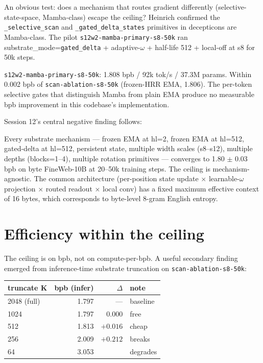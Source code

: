 An obvious test: does a mechanism that routes gradient differently (selective-state-space, Mamba-class) escape the ceiling? Heinrich confirmed the \texttt{\_selective\_scan} and \texttt{\_gated\_delta\_states} primitives in decepticons are Mamba-class. The pilot \texttt{s12w2-mamba-primary-s8-50k} ran substrate\_mode=\texttt{gated\_delta} + adaptive-$\omega$ + half-life 512 + local-off at s8 for 50k steps.

\begin{result}
\texttt{s12w2-mamba-primary-s8-50k}: 1.808 bpb / 92k tok/s / 37.3M params. Within 0.002 bpb of \texttt{scan-ablation-s8-50k} (frozen-HRR EMA, 1.806). The per-token selective gates that distinguish Mamba from plain EMA produce no measurable bpb improvement in this codebase's implementation.
\end{result}

Session 12's central negative finding follows:

\begin{result}
Every substrate mechanism --- frozen EMA at hl=2, frozen EMA at hl=512, gated-delta at hl=512, persistent state, multiple width scales (s8--s12), multiple depths (blocks=1--4), multiple rotation primitives --- converges to 1.80 $\pm$ 0.03 bpb on byte FineWeb-10B at 20--50k training steps. The ceiling is mechanism-agnostic. The common architecture (per-position state update $\times$ learnable-$\omega$ projection $\times$ routed readout $\times$ local conv) has a fixed maximum effective context of 16 bytes, which corresponds to byte-level 8-gram English entropy.
\end{result}

\section{Efficiency within the ceiling}

The ceiling is on bpb, not on compute-per-bpb. A useful secondary finding emerged from inference-time substrate truncation on \texttt{scan-ablation-s8-50k}:

\begin{center}
\begin{tabular}{lrrl}
\toprule
truncate K & bpb (infer) & $\Delta$ & note \\
\midrule
2048 (full) & 1.797 & --- & baseline \\
1024        & 1.797 & 0.000 & free \\
512         & 1.813 & $+0.016$ & cheap \\
256         & 2.009 & $+0.212$ & breaks \\
64          & 3.053 &  & degrades \\
\bottomrule
\end{tabular}
\end{center}

